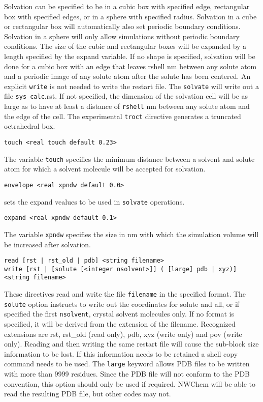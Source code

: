 Solvation can be specified to be in a cubic box with specified edge,
rectangular box with specified edges, or in a sphere with specified
radius. Solvation in a cube or rectangular box will automatically also
set periodic boundary conditions. Solvation in a sphere will only allow
simulations without periodic boundary conditions. The size of the cubic
and rectangular boxes will be expanded by a length specified by the
expand variable. If no shape is specified, solvation will be done for
a cubic box with an edge that leaves rshell nm between any solute atom and
a periodic image of any solute atom after the solute has been centered. 
An explicit \verb+write+ is not needed to write the restart file. 
The \verb+solvate+ will write out a file \verb+sys_calc+.rst.
If not specified, the dimension of the solvation cell will be as large
as to have at least a distance of \verb+rshell+ nm between any solute atom
and the edge of the cell. The experimental \verb+troct+ directive generates 
a truncated octrahedral box.

\begin{verbatim}
touch <real touch default 0.23>
\end{verbatim}

The variable \verb+touch+ specifies the minimum distance between a solvent 
and solute atom for which a solvent molecule will be accepted for solvation.

\begin{verbatim}
envelope <real xpndw default 0.0>
\end{verbatim}
sets the expand vealues to be used in \verb+solvate+ operations.

\begin{verbatim}
expand <real xpndw default 0.1>
\end{verbatim}

The variable \verb+xpndw+ specifies the size in nm with which the simulation
volume will be increased after solvation.

\begin{verbatim}
read [rst | rst_old | pdb] <string filename>
write [rst | [solute [<integer nsolvent>]] ( [large] pdb | xyz)] <string filename>
\end{verbatim}

These directives read and write the file \verb+filename+ in the specified
format. The \verb+solute+ option instructs to write out the coordinates
for solute and all, or if specified the first \verb+nsolvent+, crystal solvent 
molecules only.
If no format is specified, it will be derived from the extension of the
filename. Recognized extensions are rst, rst\_old (read only), pdb, xyz
(write only) and pov (write only).
Reading and then writing the same restart file will cause the
sub-block size information to be lost. If this information needs to be
retained a shell copy command needs to be used.
The \verb+large+ keyword allows PDB files to be written with more than 9999
residues. Since the PDB file will not conform to the PDB convention, this
option should only be used if required. NWChem will be able to read the
resulting PDB file, but other codes may not.

